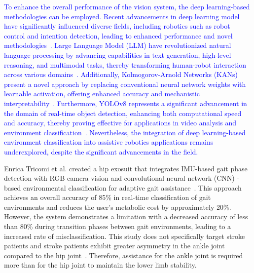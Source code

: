 \documentclass[journal,article,submit,pdftex,moreauthors]{Definitions/mdpi}
\begin{document}
\textcolor{blue}{To enhance the overall performance of the vision system, the deep learning-based methodologies can be employed. Recent advancements in deep learning model have significantly influenced diverse fields, including robotics such as robot control and intention detection, leading to enhanced performance and novel methodologies~\cite{Coser2024}. Large Language Model (LLM) have revolutionized natural language processing by advancing capabilities in text generation, high-level reasoning, and multimodal tasks, thereby transforming human-robot interaction across various domains~\cite{Zhao2023,Zhang2023}. Additionally, Kolmogorov-Arnold Networks (KANs) present a novel approach by replacing conventional neural network weights with learnable activation, offering enhanced accuracy and mechanistic interpretability~\cite{Liu2024,Cheon2024}. Furthermore, YOLOv8 represents a significant advancement in the domain of real-time object detection, enhancing both computational speed and accuracy, thereby proving effective for applications in video analysis and environment classification~\cite{Sohan2024,Hussain2023}. Nevertheless, the integration of deep learning-based environment classification into assistive robotics applications remains underexplored, despite the significant advancements in the field.}

Enrica Tricomi et al. created a hip exosuit that integrates IMU-based gait phase detection with RGB camera vision and convolutional neural network (CNN) -based environmental classification for adaptive gait assistance~\cite{Tricomi2023}. This approach achieves an overall accuracy of 85\% in real-time classification of gait environments and reduces the user's metabolic cost by approximately 20\%. However, the system demonstrates a limitation with a decreased accuracy of less than 80\% during transition phases between gait environments, leading to a increased rate of misclassification. This study does not specifically target stroke patients and stroke patients exhibit greater asymmetry in the ankle joint compared to the hip joint~\cite{Ogihara2020}. Therefore, assistance for the ankle joint is required more than for the hip joint to maintain the lower limb stability.
\end{document}
